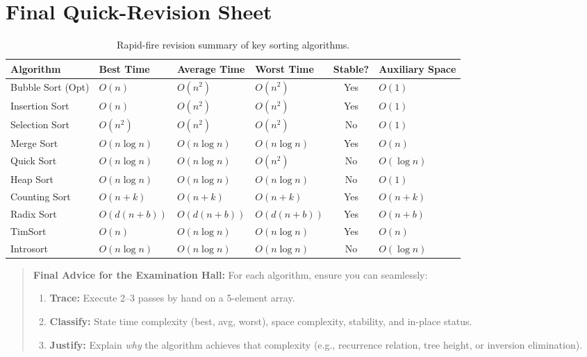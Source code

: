 \section{Final Quick-Revision Sheet}

\begin{table}[htbp]
\centering
\small
\begin{tabularx}{\textwidth}{p{3.5cm} p{2cm} p{2cm} p{2cm} c X}
\toprule
\textbf{Algorithm} & \textbf{Best Time} & \textbf{Average Time} & \textbf{Worst Time} & \textbf{Stable?} & \textbf{Auxiliary Space} \\
\midrule
Bubble Sort (Opt)  & $O(n)$ & $O(n^2)$ & $O(n^2)$ & Yes & $O(1)$ \\
Insertion Sort     & $O(n)$ & $O(n^2)$ & $O(n^2)$ & Yes & $O(1)$ \\
Selection Sort     & $O(n^2)$ & $O(n^2)$ & $O(n^2)$ & No  & $O(1)$ \\
Merge Sort         & $O(n \log n)$ & $O(n \log n)$ & $O(n \log n)$ & Yes & $O(n)$ \\
Quick Sort         & $O(n \log n)$ & $O(n \log n)$ & $O(n^2)$ & No  & $O(\log n)$ \\
Heap Sort          & $O(n \log n)$ & $O(n \log n)$ & $O(n \log n)$ & No  & $O(1)$ \\
Counting Sort      & $O(n + k)$ & $O(n + k)$ & $O(n + k)$ & Yes & $O(n + k)$ \\
Radix Sort         & $O(d(n + b))$ & $O(d(n + b))$ & $O(d(n + b))$ & Yes & $O(n + b)$ \\
TimSort            & $O(n)$ & $O(n \log n)$ & $O(n \log n)$ & Yes & $O(n)$ \\
Introsort          & $O(n \log n)$ & $O(n \log n)$ & $O(n \log n)$ & No  & $O(\log n)$ \\
\bottomrule
\end{tabularx}
\caption{Rapid-fire revision summary of key sorting algorithms.}
\end{table}

\begin{quote}
\textbf{Final Advice for the Examination Hall:} For each algorithm, ensure you can seamlessly:
\begin{enumerate}
    \item \textbf{Trace:} Execute 2--3 passes by hand on a 5-element array.
    \item \textbf{Classify:} State time complexity (best, avg, worst), space complexity, stability, and in-place status.
    \item \textbf{Justify:} Explain \textit{why} the algorithm achieves that complexity (e.g., recurrence relation, tree height, or inversion elimination).
\end{enumerate}
\end{quote}
